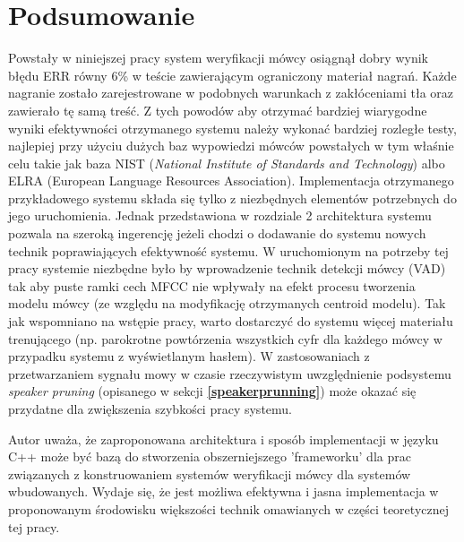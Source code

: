 \chapter{Podsumowanie}

Powstały w niniejszej pracy system weryfikacji mówcy osiągnął dobry wynik błędu ERR równy 6\% w teście zawierającym ograniczony materiał nagrań. Każde nagranie zostało zarejestrowane w podobnych warunkach z zakłóceniami tła oraz zawierało tę samą treść. Z tych powodów aby otrzymać bardziej wiarygodne wyniki efektywności otrzymanego systemu należy wykonać bardziej rozległe testy, najlepiej przy użyciu dużych baz wypowiedzi mówców powstałych w tym właśnie celu takie jak baza NIST (\textit{National Institute of Standards and Technology}) albo ELRA (European Language Resources Association). Implementacja otrzymanego przykładowego systemu składa się tylko z niezbędnych elementów potrzebnych do jego uruchomienia. Jednak przedstawiona w rozdziale 2 architektura systemu pozwala na szeroką ingerencję jeżeli chodzi o dodawanie do systemu nowych technik poprawiających efektywność systemu. W uruchomionym na potrzeby tej pracy systemie niezbędne było by wprowadzenie technik detekcji mówcy (VAD) tak aby puste ramki cech MFCC nie wpływały na efekt procesu tworzenia modelu mówcy (ze względu na modyfikację otrzymanych centroid modelu). Tak jak wspomniano na wstępie pracy, warto dostarczyć do systemu więcej materiału trenującego (np. parokrotne powtórzenia wszystkich cyfr dla każdego mówcy w przypadku systemu z wyświetlanym hasłem). W zastosowaniach z przetwarzaniem sygnału mowy w czasie rzeczywistym uwzględnienie podsystemu \textit{speaker pruning} (opisanego w sekcji \textbf{\ref{speakerprunning}}) może okazać się przydatne dla zwiększenia szybkości pracy systemu.

Autor uważa, że zaproponowana architektura i sposób implementacji w języku C++ może być bazą do stworzenia obszerniejszego 'frameworku' dla prac związanych z konstruowaniem systemów weryfikacji mówcy dla systemów wbudowanych. Wydaje się, że jest możliwa efektywna i jasna implementacja w proponowanym środowisku większości technik omawianych w części teoretycznej tej pracy.
